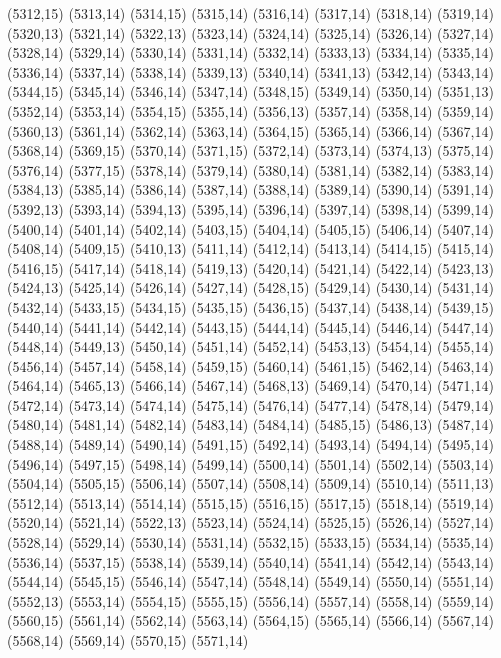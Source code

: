 (5312,15)
(5313,14)
(5314,15)
(5315,14)
(5316,14)
(5317,14)
(5318,14)
(5319,14)
(5320,13)
(5321,14)
(5322,13)
(5323,14)
(5324,14)
(5325,14)
(5326,14)
(5327,14)
(5328,14)
(5329,14)
(5330,14)
(5331,14)
(5332,14)
(5333,13)
(5334,14)
(5335,14)
(5336,14)
(5337,14)
(5338,14)
(5339,13)
(5340,14)
(5341,13)
(5342,14)
(5343,14)
(5344,15)
(5345,14)
(5346,14)
(5347,14)
(5348,15)
(5349,14)
(5350,14)
(5351,13)
(5352,14)
(5353,14)
(5354,15)
(5355,14)
(5356,13)
(5357,14)
(5358,14)
(5359,14)
(5360,13)
(5361,14)
(5362,14)
(5363,14)
(5364,15)
(5365,14)
(5366,14)
(5367,14)
(5368,14)
(5369,15)
(5370,14)
(5371,15)
(5372,14)
(5373,14)
(5374,13)
(5375,14)
(5376,14)
(5377,15)
(5378,14)
(5379,14)
(5380,14)
(5381,14)
(5382,14)
(5383,14)
(5384,13)
(5385,14)
(5386,14)
(5387,14)
(5388,14)
(5389,14)
(5390,14)
(5391,14)
(5392,13)
(5393,14)
(5394,13)
(5395,14)
(5396,14)
(5397,14)
(5398,14)
(5399,14)
(5400,14)
(5401,14)
(5402,14)
(5403,15)
(5404,14)
(5405,15)
(5406,14)
(5407,14)
(5408,14)
(5409,15)
(5410,13)
(5411,14)
(5412,14)
(5413,14)
(5414,15)
(5415,14)
(5416,15)
(5417,14)
(5418,14)
(5419,13)
(5420,14)
(5421,14)
(5422,14)
(5423,13)
(5424,13)
(5425,14)
(5426,14)
(5427,14)
(5428,15)
(5429,14)
(5430,14)
(5431,14)
(5432,14)
(5433,15)
(5434,15)
(5435,15)
(5436,15)
(5437,14)
(5438,14)
(5439,15)
(5440,14)
(5441,14)
(5442,14)
(5443,15)
(5444,14)
(5445,14)
(5446,14)
(5447,14)
(5448,14)
(5449,13)
(5450,14)
(5451,14)
(5452,14)
(5453,13)
(5454,14)
(5455,14)
(5456,14)
(5457,14)
(5458,14)
(5459,15)
(5460,14)
(5461,15)
(5462,14)
(5463,14)
(5464,14)
(5465,13)
(5466,14)
(5467,14)
(5468,13)
(5469,14)
(5470,14)
(5471,14)
(5472,14)
(5473,14)
(5474,14)
(5475,14)
(5476,14)
(5477,14)
(5478,14)
(5479,14)
(5480,14)
(5481,14)
(5482,14)
(5483,14)
(5484,14)
(5485,15)
(5486,13)
(5487,14)
(5488,14)
(5489,14)
(5490,14)
(5491,15)
(5492,14)
(5493,14)
(5494,14)
(5495,14)
(5496,14)
(5497,15)
(5498,14)
(5499,14)
(5500,14)
(5501,14)
(5502,14)
(5503,14)
(5504,14)
(5505,15)
(5506,14)
(5507,14)
(5508,14)
(5509,14)
(5510,14)
(5511,13)
(5512,14)
(5513,14)
(5514,14)
(5515,15)
(5516,15)
(5517,15)
(5518,14)
(5519,14)
(5520,14)
(5521,14)
(5522,13)
(5523,14)
(5524,14)
(5525,15)
(5526,14)
(5527,14)
(5528,14)
(5529,14)
(5530,14)
(5531,14)
(5532,15)
(5533,15)
(5534,14)
(5535,14)
(5536,14)
(5537,15)
(5538,14)
(5539,14)
(5540,14)
(5541,14)
(5542,14)
(5543,14)
(5544,14)
(5545,15)
(5546,14)
(5547,14)
(5548,14)
(5549,14)
(5550,14)
(5551,14)
(5552,13)
(5553,14)
(5554,15)
(5555,15)
(5556,14)
(5557,14)
(5558,14)
(5559,14)
(5560,15)
(5561,14)
(5562,14)
(5563,14)
(5564,15)
(5565,14)
(5566,14)
(5567,14)
(5568,14)
(5569,14)
(5570,15)
(5571,14)
